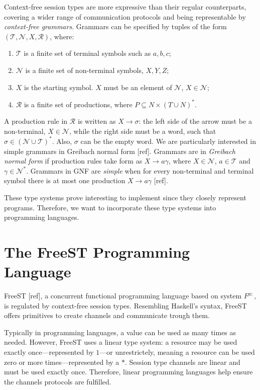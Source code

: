 Context-free session types are more expressive than their regular counterparts, covering a wider range of communication protocols and being representable by \textit{context-free grammars}.
Grammars can be specified by tuples of the form $(\mathcal{T, N}, X, \mathcal{R})$, where: 
\begin{enumerate}
    \item $\mathcal{T}$ is a finite set of terminal symbols such as $a, b, c$; 
    \item $\mathcal{N}$ is a finite set of non-terminal symbols, $X, Y, Z$;
    \item $X$ is the starting symbol. $X$ must be an element of $\mathcal{N}$, $X\in\mathcal{N}$;
    \item $\mathcal{R}$ is a finite set of productions, where $P \subseteq N \times (T \cup N)^*$. 
\end{enumerate}
A production rule in $\mathcal{R}$ is written as $X \rightarrow \sigma$: the left side of the arrow must be a non-terminal, $X\in\mathcal{N}$, while the right side must be a word, such that $\sigma\in(\mathcal{N}\cup\mathcal{T})^*$. Also, $\sigma$ can be the empty word. We are particularly interested in simple grammars in Greibach normal form [ref]. Grammars are in \textit{Greibach normal form} if production rules take form as $X \rightarrow a\gamma$, where $X\in\mathcal{N}$, $a\in\mathcal{T}$ and $\gamma\in\mathcal{N}^*$. Grammars in GNF are \emph{simple} when for every non-terminal and terminal symbol there is at most one production $X \rightarrow a\gamma$ [ref].

These type systems prove interesting to implement since they closely represent programs. Therefore, we want to incorporate these type systems into programming languages.

\section{The FreeST Programming Language}
FreeST [ref], a concurrent functional programming language based on system $F^{\mu;}$, is regulated by context-free session types. Resembling Haskell's syntax, FreeST offers primitives to create channels and communicate trough them.

Typically in programming languages, a value can be used as many times as needed. However, FreeST uses a linear type system: a resource may be used exactly once---represented by $1$---or unrestrictely, meaning a resource can be used zero or more times---represented by a $*$. Session type channels are linear and must be used exactly once. Therefore, linear programming languages help ensure the channels protocols are fulfilled. 

